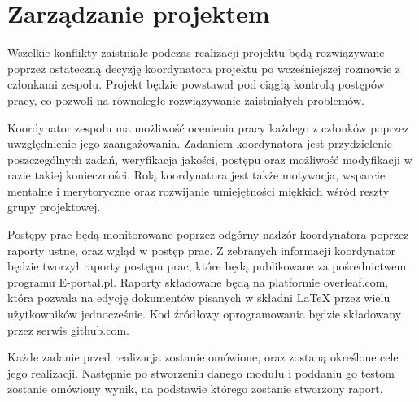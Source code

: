 \section{Zarządzanie projektem}
\label{sec:zarzadzanie_projektem} %
Wszelkie konflikty zaistniałe podczas realizacji projektu będą rozwiązywane poprzez ostateczną decyzję koordynatora projektu po wcześniejszej rozmowie z członkami zespołu. Projekt będzie powstawał pod ciągłą kontrolą postępów pracy, co pozwoli na równoległe rozwiązywanie zaistniałych problemów.

Koordynator zespołu ma możliwość ocenienia pracy każdego z członków poprzez uwzględnienie jego zaangażowania. Zadaniem koordynatora jest przydzielenie poszczególnych zadań, weryfikacja jakości, postępu oraz możliwość modyfikacji w razie takiej konieczności. Rolą koordynatora jest także motywacja, wsparcie mentalne i merytoryczne oraz rozwijanie umiejętności miękkich wśród reszty grupy projektowej.

Postępy prac będą monitorowane poprzez odgórny nadzór koordynatora poprzez raporty ustne, oraz wgląd w postęp prac. Z zebranych informacji koordynator będzie tworzył raporty postępu prac, które będą publikowane za pośrednictwem programu E-portal.pl. Raporty składowane będą na platformie overleaf.com, która pozwala na edycję dokumentów pisanych w składni {\LaTeX} przez wielu użytkowników jednocześnie. Kod źródłowy oprogramowania będzie składowany przez serwis github.com.

Każde zadanie przed realizacja zostanie omówione, oraz zostaną określone cele jego realizacji. Następnie po stworzeniu danego modułu i poddaniu go testom zostanie omówiony wynik, na podstawie którego zostanie stworzony raport. 